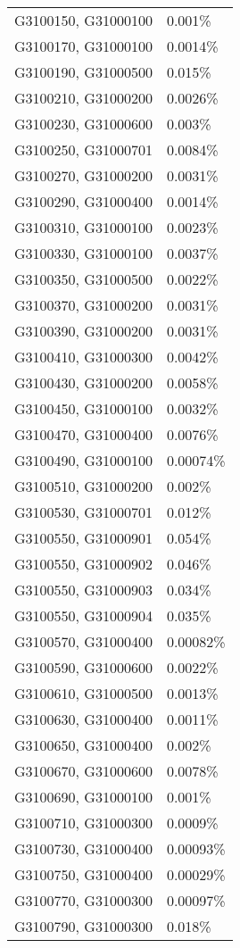 \begin{longtable}[]{@{}ll@{}}
G3100150, G31000100 & 0.001\% \\
G3100170, G31000100 & 0.0014\% \\
G3100190, G31000500 & 0.015\% \\
G3100210, G31000200 & 0.0026\% \\
G3100230, G31000600 & 0.003\% \\
G3100250, G31000701 & 0.0084\% \\
G3100270, G31000200 & 0.0031\% \\
G3100290, G31000400 & 0.0014\% \\
G3100310, G31000100 & 0.0023\% \\
G3100330, G31000100 & 0.0037\% \\
G3100350, G31000500 & 0.0022\% \\
G3100370, G31000200 & 0.0031\% \\
G3100390, G31000200 & 0.0031\% \\
G3100410, G31000300 & 0.0042\% \\
G3100430, G31000200 & 0.0058\% \\
G3100450, G31000100 & 0.0032\% \\
G3100470, G31000400 & 0.0076\% \\
G3100490, G31000100 & 0.00074\% \\
G3100510, G31000200 & 0.002\% \\
G3100530, G31000701 & 0.012\% \\
G3100550, G31000901 & 0.054\% \\
G3100550, G31000902 & 0.046\% \\
G3100550, G31000903 & 0.034\% \\
G3100550, G31000904 & 0.035\% \\
G3100570, G31000400 & 0.00082\% \\
G3100590, G31000600 & 0.0022\% \\
G3100610, G31000500 & 0.0013\% \\
G3100630, G31000400 & 0.0011\% \\
G3100650, G31000400 & 0.002\% \\
G3100670, G31000600 & 0.0078\% \\
G3100690, G31000100 & 0.001\% \\
G3100710, G31000300 & 0.0009\% \\
G3100730, G31000400 & 0.00093\% \\
G3100750, G31000400 & 0.00029\% \\
G3100770, G31000300 & 0.00097\% \\
G3100790, G31000300 & 0.018\% \\

\end{longtable}
